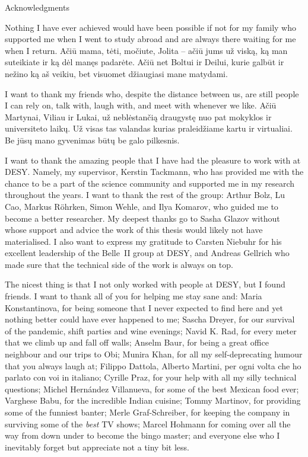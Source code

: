 \begin{abstractpage}{Acknowledgments}
    Nothing I have ever achieved would have been possible if not for my family who supported me
    when I went to study abroad and are always there waiting for me when I return.
    Ačiū mama, tėti, močiute, Jolita -- ačiū jums už viską, ką man suteikiate ir ką dėl manęs padarėte.
    Ačiū net Boltui ir Deilui, kurie galbūt ir nežino ką aš veikiu, bet visuomet džiaugiasi mane matydami.

    I want to thank my friends who, despite the distance between us, are still people I can rely on, talk with,
    laugh with, and meet with whenever we like.
    Ačiū Martynai, Viliau ir Lukai, už neblėstančią draugystę nuo pat mokyklos ir universiteto laikų.
    Už visas tas valandas kurias praleidžiame kartu ir virtualiai.
    Be jūsų mano gyvenimas būtų be galo pilkesnis.

    I want to thank the amazing people that I have had the pleasure to work with at DESY.
    Namely, my supervisor, Kerstin Tackmann, who has provided me with the chance to be a part of the science community
    and supported me in my research throughout the years.
    I want to thank the rest of the group: Arthur Bolz, Lu Cao, Markus R\"ohrken, Simon Wehle, and Ilya Komarov, who guided me to become a better researcher.
    My deepest thanks go to Sasha Glazov without whose support and advice the work of this thesis would likely not have materialised.
    I also want to express my gratitude to Carsten Niebuhr for his excellent leadership of the Belle~II group at DESY,
    and Andreas Gellrich who made sure that the technical side of the work is always on top.
   
    The nicest thing is that I not only worked with people at DESY, but I found friends.
    I want to thank all of you for helping me stay sane and:
    Maria Konstantinova, for being someone that I never expected to find here and yet nothing better could have ever happened to me;
    Sascha Dreyer, for our survival of the pandemic, shift parties and wine evenings;
    Navid K. Rad, for every meter that we climb up and fall off walls;
    Anselm Baur, for being a great office neighbour and our trips to Obi;
    Munira Khan, for all my self-deprecating humour that you always laugh at;
    Filippo Dattola, Alberto Martini, per ogni volta che ho parlato con voi in italiano;
    Cyrille Praz, for your help with all my silly technical questions;
    Michel Hern\'andez Villanueva, for some of the best Mexican food ever;
    Varghese Babu, for the incredible Indian cuisine;
    Tommy Martinov, for providing some of the funniest banter;
    Merle Graf-Schreiber, for keeping the company in surviving some of the \textit{best} TV shows;
    Marcel Hohmann for coming over all the way from down under to become the bingo master;
    and everyone else who I inevitably forget but appreciate not a tiny bit less.
    

\end{abstractpage}
